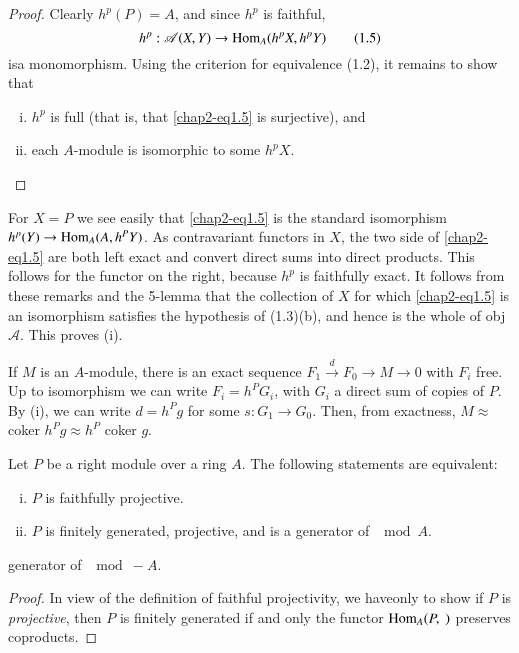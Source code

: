 \begin{proof}
Clearly $h^p(P) = A$, and since $h^p$ is faithful, 
\begin{equation*}
h^p : \mathscr{A} (X, Y) \to \operatorname{Hom}_A (h^pX , h^pY)
\tag{1.5}\label{chap2-eq1.5} 
\end{equation*}
is\pageoriginale a monomorphism. Using the criterion for equivalence
(1.2), it remains to show that   
\begin{enumerate}[(i)]
\item $h^p$ is full (that is, that \eqref{chap2-eq1.5} is surjective), and 

\item each $A$-module is isomorphic to some $h^pX$. 
\end{enumerate}
\end{proof}

For $X = P$ we see easily that \eqref{chap2-eq1.5} is the standard isomorphism
$h^p(Y) \to \operatorname{Hom}_A (A, h^P Y)$. As contravariant functors in $X$,
the two side of \eqref{chap2-eq1.5} are both left exact and convert direct sums into
direct products. This follows for the functor on the right, because
$h^p$ is faithfully exact. It follows from these remarks and the
5-lemma that the collection of $X$ for which \eqref{chap2-eq1.5} is an isomorphism
satisfies the hypothesis of (1.3)(b), and hence is the whole of obj
$\mathscr{A}$. This proves (i).  

If $M$ is an $A$-module, there is an exact sequence $F_1
\xrightarrow{d}F_0 \to M \to 0$ with $F_i$ free. Up to isomorphism we
can write $F_i = h^P G_i$, with $G_i$ a direct sum of copies of $P$. By
(i), we can write $d = h^P g $ for some $s : G_1 \to G_0$. Then, from
exactness, $M \approx$ coker $h^P g \approx h^P$ coker $g$.  

\setcounter{prop}{4}
\begin{prop}\label{chap2:prop1.5}%
Let $P$ be a right module over a ring $A$. The following statements
are equivalent: 
\begin{enumerate}[(i)]
\item $P$ is faithfully projective. 

\item $P$ is finitely generated, projective, and is a generator of
  $\mod A$.  
\end{enumerate}
generator of $\mod - A$.
\end{prop}

\begin{proof}
In view of the definition of faithful projectivity, we
have\pageoriginale only to 
show if $P$ is {\em projective}, then $P$ is finitely generated if and
only the functor $\operatorname{Hom}_A(P, ~ )$ preserves coproducts.  
\end{proof}

